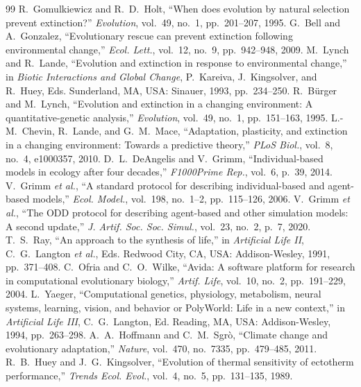 \documentclass[conference]{IEEEtran}
\begin{document}
\begin{thebibliography}{99}
 R.~Gomulkiewicz and R.~D.~Holt, ``When does evolution by natural selection prevent extinction?'' \emph{Evolution}, vol.~49, no.~1, pp.~201--207, 1995.
 G.~Bell and A.~Gonzalez, ``Evolutionary rescue can prevent extinction following environmental change,'' \emph{Ecol. Lett.}, vol.~12, no.~9, pp.~942--948, 2009.
 M.~Lynch and R.~Lande, ``Evolution and extinction in response to environmental change,'' in \emph{Biotic Interactions and Global Change}, P.~Kareiva, J.~Kingsolver, and R.~Huey, Eds. Sunderland, MA, USA: Sinauer, 1993, pp.~234--250.
 R.~B\"urger and M.~Lynch, ``Evolution and extinction in a changing environment: A quantitative-genetic analysis,'' \emph{Evolution}, vol.~49, no.~1, pp.~151--163, 1995.
 L.-M.~Chevin, R.~Lande, and G.~M.~Mace, ``Adaptation, plasticity, and extinction in a changing environment: Towards a predictive theory,'' \emph{PLoS Biol.}, vol.~8, no.~4, e1000357, 2010.
 D.~L.~DeAngelis and V.~Grimm, ``Individual-based models in ecology after four decades,'' \emph{F1000Prime Rep.}, vol.~6, p.~39, 2014.
 V.~Grimm \emph{et al.}, ``A standard protocol for describing individual-based and agent-based models,'' \emph{Ecol. Model.}, vol.~198, no.~1--2, pp.~115--126, 2006.
 V.~Grimm \emph{et al.}, ``The ODD protocol for describing agent-based and other simulation models: A second update,'' \emph{J. Artif. Soc. Soc. Simul.}, vol.~23, no.~2, p.~7, 2020.
 T.~S.~Ray, ``An approach to the synthesis of life,'' in \emph{Artificial Life II}, C.~G.~Langton \emph{et al.}, Eds. Redwood City, CA, USA: Addison-Wesley, 1991, pp.~371--408.
 C.~Ofria and C.~O.~Wilke, ``Avida: A software platform for research in computational evolutionary biology,'' \emph{Artif. Life}, vol.~10, no.~2, pp.~191--229, 2004.
 L.~Yaeger, ``Computational genetics, physiology, metabolism, neural systems, learning, vision, and behavior or PolyWorld: Life in a new context,'' in \emph{Artificial Life III}, C.~G.~Langton, Ed. Reading, MA, USA: Addison-Wesley, 1994, pp.~263--298.
 A.~A.~Hoffmann and C.~M.~Sgr\`o, ``Climate change and evolutionary adaptation,'' \emph{Nature}, vol.~470, no.~7335, pp.~479--485, 2011.
 R.~B.~Huey and J.~G.~Kingsolver, ``Evolution of thermal sensitivity of ectotherm performance,'' \emph{Trends Ecol. Evol.}, vol.~4, no.~5, pp.~131--135, 1989.

\end{thebibliography}
\end{document}
